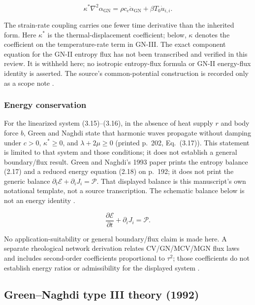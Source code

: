 \begin{equation}
\kappa^*\nabla^2\alpha_{\mathrm{GN}} = \rho c_e \ddot{\alpha}_{\mathrm{GN}} + \beta T_0 \dot{u}_{i,i}.
\label{eq:4.11}
\end{equation}

The strain-rate coupling carries one fewer time derivative than the inherited form. Here $\kappa^*$ is the thermal-displacement coefficient; below, $\kappa$ denotes the coefficient on the temperature-rate term in GN-III. The exact component equation for the GN-II entropy flux has not been transcribed and verified in this review. It is withheld here; no isotropic entropy-flux formula or GN-II energy-flux identity is asserted. The source's common-potential construction is recorded only as a scope note \cite{Green1993}.

\subsubsection{Energy conservation}

For the linearized system (3.15)--(3.16), in the absence of heat supply $r$ and body force $b$, Green and Naghdi state that harmonic waves propagate without damping under $c>0$, $\kappa^*\geq0$, and $\lambda+2\mu\geq0$ (printed p.~202, Eq.~(3.17)). This statement is limited to that system and those conditions; it does not establish a general boundary/flux result. Green and Naghdi's 1993 paper prints the entropy balance (2.17) and a reduced energy equation (2.18) on p.~192; it does not print the generic balance $\partial_t\mathcal{E} + \partial_i J_i = \mathcal{P}$. That displayed balance is this manuscript's own notational template, not a source transcription. The schematic balance below is not an energy identity \cite{Green1993}.

\begin{equation}
\frac{\partial\mathcal{E}}{\partial t} + \partial_i J_i = \mathcal{P}.
\label{eq:4.13}
\end{equation}

No application-suitability or general boundary/flux claim is made here. A separate rheological network derivation relates CV/GN/MCV/MGN flux laws and includes second-order coefficients proportional to $\tau^2$; those coefficients do not establish energy ratios or admissibility for the displayed system \cite{Huang2025}.

\subsection{Green--Naghdi type III theory (1992)}
\label{sec:4.6}

